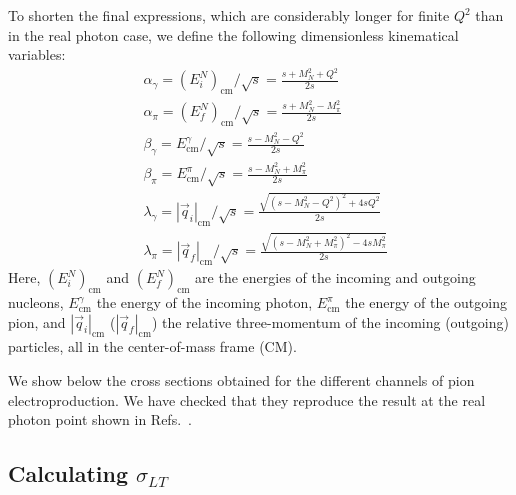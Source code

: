 \documentclass[twocolumn,prc,showpacs,nofootinbib,preprintnumbers,amsmath,amssymb,superscriptaddress]{revtex4-1}
\begin{document}
To shorten the final expressions, which are considerably longer for finite $Q^2$ than in the real photon case, we define the following dimensionless kinematical variables:
\begin{align}
&\alpha_\gamma= (E_i^{N})_\mathrm{cm}/\sqrt{s}=\frac{s+M_N^2+Q^2}{2 s}   \\
&\alpha_\pi= (E_f^{N})_\mathrm{cm}/\sqrt{s} = \frac{s+M_N^2-M_\pi^2}{2 s}  \\              
 & \beta_\gamma = E^{\gamma}_\mathrm{cm}/\sqrt{s} = \frac{s-M_N^2-Q^2}{2 s}   \\
 & \beta_\pi= E^{\pi}_\mathrm{cm}/\sqrt{s} = \frac{s-M_N^2+M_\pi^2}{2 s}  \\
 &\lambda_\gamma  = |\vec{q}_i|_\mathrm{cm}/\sqrt{s}= \frac{\sqrt{(s-M_N^2 - Q^2)^2+4 s Q^2}}{2 s}  \\
&\lambda_\pi =  |\vec{q}_f|_\mathrm{cm}/\sqrt{s}  = \frac{\sqrt{(s-M_N^2 + M_\pi^2)^2-4 s M_\pi^2}}{2 s}  
\end{align} 
Here, $(E_i^{N})_\mathrm{cm}$  and $(E_f^{N})_\mathrm{cm}$ are the energies of the incoming and outgoing nucleons, $E^{\gamma}_\mathrm{cm}$ the energy of the incoming photon, $E^{\pi}_\mathrm{cm}$ the energy of the outgoing pion, and $|\vec{q}_i|_\mathrm{cm}$ ($|\vec{q}_f|_\mathrm{cm}$) the relative three-momentum of the incoming (outgoing) particles, all in the center-of-mass frame (CM).

We show below the cross sections obtained for the different channels of pion electroproduction. 
We have checked that they reproduce the result at the real photon point shown in Refs.~\cite{Lensky:2009uv,Holstein:2005db}.

\subsection{Calculating $\sigma_{LT}$}
\label{App:Extracting-SigmaLT}
\end{document}
